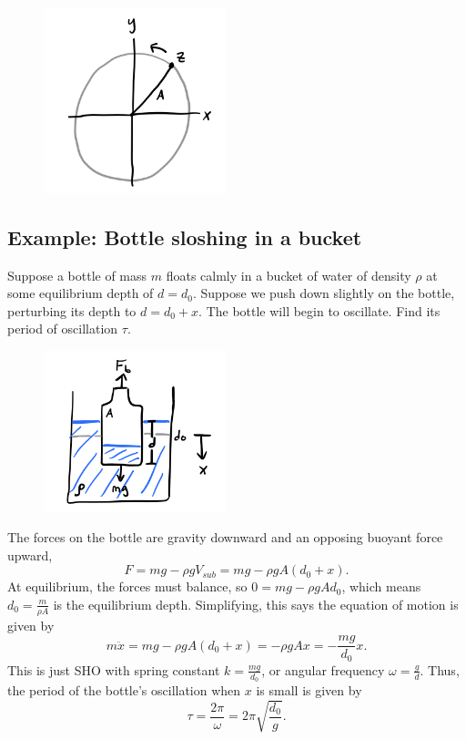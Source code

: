 \documentclass[
  letterpaper,
  DIV=11,
  numbers=noendperiod]{scrreprt}
\begin{document}
\begin{figure}

{\centering \includegraphics[width=2.08333in,height=\textheight]{classical-mechanics/./resources/image-20230215084009899.png}

}

\end{figure}

\hypertarget{example-bottle-sloshing-in-a-bucket}{%
\subsection{Example: Bottle sloshing in a
bucket}\label{example-bottle-sloshing-in-a-bucket}}

Suppose a bottle of mass \(m\) floats calmly in a bucket of water of
density \(\rho\) at some equilibrium depth of \(d=d_0\). Suppose we push
down slightly on the bottle, perturbing its depth to \(d = d_0 + x\).
The bottle will begin to oscillate. Find its period of oscillation
\(\tau\).

\begin{figure}

{\centering \includegraphics[width=2.08333in,height=\textheight]{classical-mechanics/./resources/image-20230215084145892.png}

}

\end{figure}

The forces on the bottle are gravity downward and an opposing buoyant
force upward, \[
F = mg - \rho g V_{sub} = mg - \rho g A(d_0 + x).
\] At equilibrium, the forces must balance, so
\(0 = mg - \rho g A d_0\), which means \(d_0 = \frac{m}{\rho A}\) is the
equilibrium depth. Simplifying, this says the equation of motion is
given by \[
m \ddot x = mg - \rho g A(d_0 + x) = -\rho g A x = -\frac{mg}{d_0} x.
\] This is just SHO with spring constant \(k = \frac{mg}{d_0}\), or
angular frequency \(\omega = \frac{g}{d}\). Thus, the period of the
bottle's oscillation when \(x\) is small is given by \[
\tau = \frac{2 \pi}{\omega} = 2\pi\sqrt{\frac{d_0}{g}}.
\]
\end{document}
